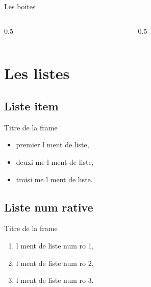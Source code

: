 \documentclass{article}
\begin{document}
\begin{frame}{Les boites}

\begin{columns}

\begin{column}{0.5\textwidth}


\end{column}

\begin{column}{0.5\textwidth}



\end{column}

\end{columns}


\end{frame}



\section{Les listes}
	\subsection{Liste   item}

\begin{frame}{Titre de la frame}

	\begin{itemize}
		\item premier  l ment de liste,
		\item deuxi me  l ment de liste,
		\item troisi me  l ment de liste.
	\end{itemize}
\end{frame} 

		\subsection{Liste  num rative} 
\begin{frame}{Titre de la frame} 
	\begin{enumerate}
		\item  l ment de liste num ro 1,
		\item  l ment de liste num ro 2,
		\item  l ment de liste num ro 3.  
	\end{enumerate}
\end{frame}
\end{document}
